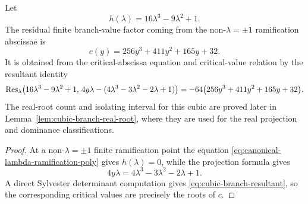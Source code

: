 \begin{lemma}\label{lem:cubic-branch-elimination}
Let
\[
h(\lambda)=16\lambda^3-9\lambda^2+1.
\]
The residual finite branch-value factor coming from the non-$\lambda=\pm1$ ramification abscissae is
\[
c(y)=256y^3+411y^2+165y+32.
\]
It is obtained from the critical-abscissa equation and critical-value relation by the resultant identity
\begin{equation}\label{eq:cubic-branch-resultant}
\operatorname{Res}_\lambda\!\left(
16\lambda^3-9\lambda^2+1,\,
4y\lambda-(4\lambda^3-3\lambda^2-2\lambda+1)
\right)
=-64\bigl(256y^3+411y^2+165y+32\bigr).
\end{equation}
The real-root count and isolating interval for this cubic are proved later in Lemma~\ref{lem:cubic-branch-real-root}, where they are used for the real projection and dominance classifications.
\end{lemma}
\begin{proof}
At a non-$\lambda=\pm1$ finite ramification point the equation \eqref{eq:canonical-lambda-ramification-poly} gives $h(\lambda)=0$, while the projection formula gives
\[
4y\lambda=4\lambda^3-3\lambda^2-2\lambda+1.
\]
A direct Sylvester determinant computation gives \eqref{eq:cubic-branch-resultant}, so the corresponding critical values are precisely the roots of $c$.
\end{proof}

